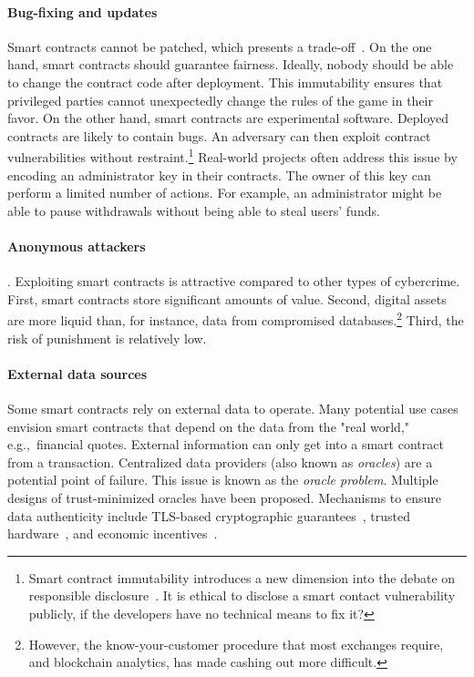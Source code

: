 \paragraph{Bug-fixing and updates}
Smart contracts cannot be patched, which presents a trade-off~\cite{Porru2017}.
On the one hand, smart contracts should guarantee fairness.
Ideally, nobody should be able to change the contract code after deployment.
This immutability ensures that privileged parties cannot unexpectedly change the rules of the game in their favor.
On the other hand, smart contracts are experimental software.
Deployed contracts are likely to contain bugs.
An adversary can then exploit contract vulnerabilities without restraint.\footnote{Smart contract immutability introduces a new dimension into the debate on responsible disclosure~\cite{Schneier2007}. It is ethical to disclose a smart contact vulnerability publicly, if the developers have no technical means to fix it?}
Real-world projects often address this issue by encoding an administrator key in their contracts.
The owner of this key can perform a limited number of actions.
For example, an administrator might be able to pause withdrawals without being able to steal users' funds.

\paragraph{Anonymous attackers}.
Exploiting smart contracts is attractive compared to other types of cybercrime.
First, smart contracts store significant amounts of value.
Second, digital assets are more liquid than, for instance, data from compromised databases.\footnote{However, the know-your-customer procedure that most exchanges require, and blockchain analytics, has made cashing out more difficult.}
Third, the risk of punishment is relatively low.

\paragraph{External data sources}
Some smart contracts rely on external data to operate.
Many potential use cases envision smart contracts that depend on the data from the "real world," e.g.,~financial quotes.
External information can only get into a smart contract from a transaction.
Centralized data providers (also known as \textit{oracles}) are a potential point of failure.
This issue is known as the \textit{oracle problem}.
Multiple designs of trust-minimized oracles have been proposed.
Mechanisms to ensure data authenticity include TLS-based cryptographic guarantees~\cite{Provable}, trusted hardware~\cite{Zhang2016}, and economic incentives~\cite{Chainlink}.

